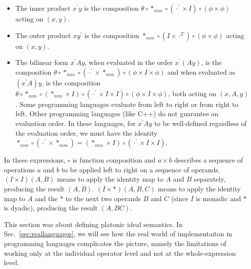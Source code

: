 \begin{itemize}
\item
The inner product $x^\prime y$ is the composition
$\theta\circ*_{mm}\circ\left(\cdot^\prime\times I\right)\circ\left(\phi\times\phi\right)$
acting on $(x,y)$.

\item
The outer product $xy^\prime$ is the composition
$*_{mm}\circ\left(I\times\cdot^{T}\right)\circ\left(\phi\times\phi\right)$
acting on $(x,y)$.

\item
The bilinear form $x^\prime Ay$, when evaluated in the order $x^\prime(Ay)$, is the composition
$\theta\circ*_{mm}\circ\left(\cdot^\prime\times*_{mm}\right)\circ\left(\phi\times I\times\phi\right)$ %
%
and when evaluated as $(x^\prime A)y$,
is the composition $\theta\circ*_{mm}\circ\left(*_{mm}\times I\right)\circ\left(\cdot^\prime\times I\times I\right)\circ\left(\phi\times I\times\phi\right)$,
%
both acting on $(x,A,y)$.
%
Some programming languages evaluate from left to right or from right to left.
Other programming languages (like C++) do not guarantee an evaluation order.
In these languages, for $x^\prime Ay$ to be well-defined regardless of the evaluation order, we must have the identity $*_{mm}\circ\left(\cdot^\prime\times*_{mm}\right)=\left(*_{mm}\times I\right)\circ\left(\cdot^\prime\times I\times I\right)$.
\end{itemize}

In these expressions, $\circ$ is function composition and $a\times b$
describes a sequence of operations $a$ and $b$ to be applied left
to right on a sequence of operands. $(I\times I)(A,B)$ means to apply
the identity map to $A$ and $B$ separately, producing the result
$(A,B)$. $(I\times*)(A,B,C)$ means to apply the identity map to
$A$ and the $*$ to the next two operands $B$ and $C$ (since $I$
is monadic and $*$ is dyadic), producing the result $(A,BC)$.

This section was about defining platonic ideal semantics. In Sec.~\ref{sec:reallanguages}, we will see how the real world of implementaiton in programming languages complicates the picture, namely the limitations of working only at the individual operator level and not at the whole-expression
level.
